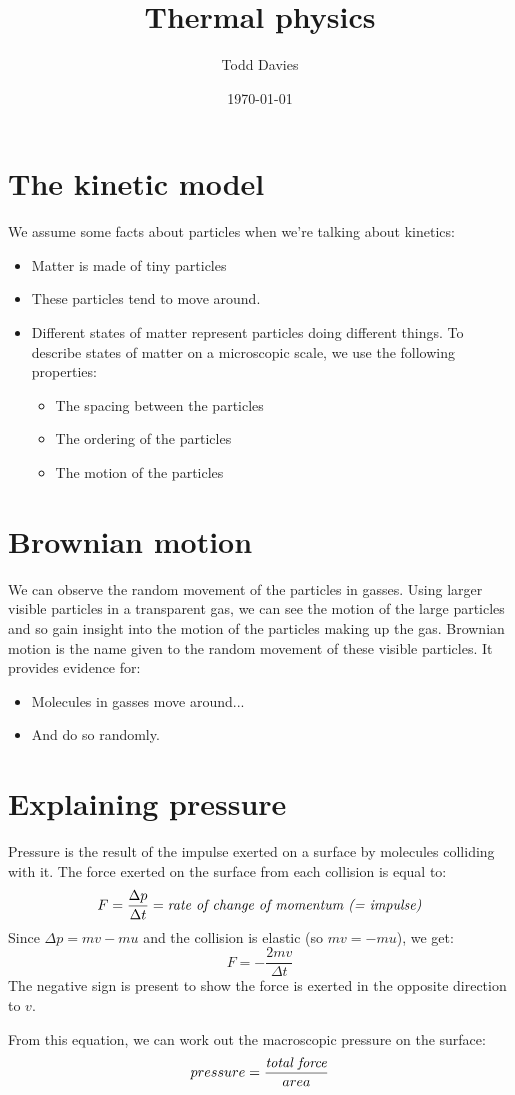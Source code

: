 \documentclass{article}
\title{Thermal physics}
\author{Todd Davies}
\date{\today}
\begin{document}
\lhead{\today}

\maketitle

\section*{The kinetic model}
\thispagestyle{empty}
We assume some facts about particles when we're talking about kinetics:
\begin{itemize}
	\item Matter is made of tiny particles
	\item These particles tend to move around.
	\item Different states of matter represent particles doing different things. To describe states of matter on a microscopic scale, we use the following properties:
		\begin{itemize}
			\item The spacing between the particles
			\item The ordering of the particles
			\item The motion of the particles
		\end{itemize}
\end{itemize}

\section*{Brownian motion}
We can observe the random movement of the particles in gasses. Using larger visible particles in a transparent gas, we can see the motion of the large particles and so gain insight into the motion of the particles making up the gas. Brownian motion is the name given to the random movement of these visible particles. It provides evidence for:
\begin{itemize}
	\item Molecules in gasses move around...
	\item And do so randomly.
\end{itemize}

\section*{Explaining pressure}
Pressure is the result of the impulse exerted on a surface by molecules colliding with it. The force exerted on the surface from each collision is equal to:
\[
	F = \frac{\Delta p}{\Delta t} = \textrm{\textit{rate of change of momentum (= impulse)}}
\]
Since $\Delta p = mv - mu$ and the collision is elastic (so $mv = -mu$), we get:
\[
	F = -\frac{2mv}{\Delta t}
\]
The negative sign is present to show the force is exerted in the opposite direction to $v$.

From this equation, we can work out the macroscopic pressure on the surface:
\[
	pressure = \frac{\textrm{\textit{total force}}}{area}
\]
\end{document}
